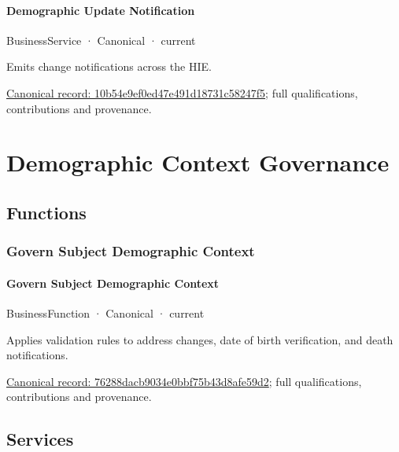 \paragraph{Demographic Update Notification}

\label{element:10b54e9ef0ed47e491d18731c58247f5}
{\small BusinessService · Canonical · current}\par

Emits change notifications across the HIE.


{\footnotesize \href{../../../../continuum/business/business-service/10b54e9ef0ed47e491d18731c58247f5.md}{Canonical record: 10b54e9ef0ed47e491d18731c58247f5}; full qualifications, contributions and provenance.}\par
\section{Demographic Context Governance}

\subsection{Functions}

\subsubsection{Govern Subject Demographic Context}

\paragraph{Govern Subject Demographic Context}

\label{element:76288dacb9034e0bbf75b43d8afe59d2}
{\small BusinessFunction · Canonical · current}\par

Applies validation rules to address changes, date of birth verification, and death notifications.


{\footnotesize \href{../../../../continuum/business/business-function/76288dacb9034e0bbf75b43d8afe59d2.md}{Canonical record: 76288dacb9034e0bbf75b43d8afe59d2}; full qualifications, contributions and provenance.}\par
\subsection{Services}

